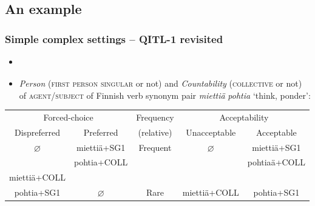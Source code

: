 \documentclass[t]{beamer} %
\begin{document}
\subsection{An example}

\begin{frame}
  \frametitle{Simple \vs complex settings -- QITL-1 revisited}

  \begin{itemize}
  \item \citet{Arppe:Jarvikivi:02,Arppe:Jarvikivi:07}
  \item \textit{Person} (\textsc{first person singular} or not) and
    \textit{Countability} (\textsc{collective} or not) of \textsc{agent/subject} of
    Finnish verb synonym pair \textit{mietti{\"a}} \vs \textit{pohtia}
    `think, ponder':
  \end{itemize}

  \begin{center}\scriptsize
    \begin{tabular}{ c  c || c || c  c}
      \hline
      \multicolumn{2}{c||}{Forced-choice}                     & Frequency           & \multicolumn{2}{c}{Acceptability}    \\
      Dispreferred                          & Preferred       & (relative)          & Unacceptable                          & Acceptable       \\ \hline \hline
      \multicolumn{1}{c|}{$\varnothing$}    & mietti{\"a}+SG1 & Frequent            & \multicolumn{1}{c|}{$\varnothing$}    & mietti{\"a}+SG1  \\
      \multicolumn{1}{c|}{}                 & pohtia+COLL     &                     & \multicolumn{1}{c|}{}                 & pohtia{\"a}+COLL \\ \hline
      \multicolumn{1}{c|}{mietti{\"a}+COLL} &                 &                     & \multicolumn{1}{c|}{}                 &                  \\
      \multicolumn{1}{c|}{pohtia+SG1}       & $\varnothing$   & Rare                & \multicolumn{1}{c|}{mietti{\"a}+COLL} & pohtia+SG1       \\
      \hline
    \end{tabular}
  \end{center}
\end{frame}
\end{document}
